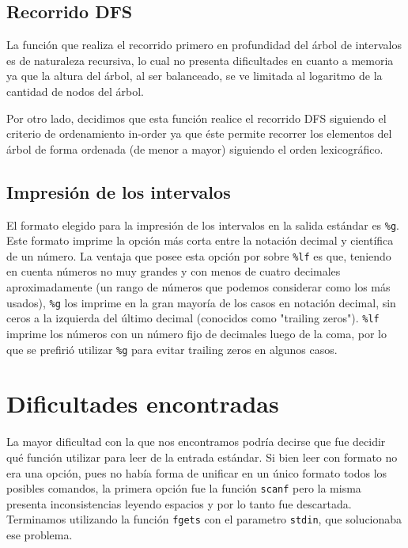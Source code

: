 \documentclass[11pt]{article}
\begin{document}
 \subsection{Recorrido DFS}
 
 La función que realiza el recorrido primero en profundidad del árbol de intervalos es de naturaleza recursiva, lo cual no presenta dificultades en cuanto a memoria ya que la altura del árbol, al ser balanceado, se ve limitada al logaritmo de la cantidad de nodos del árbol. \par

 Por otro lado, decidimos que esta función realice el recorrido DFS siguiendo el criterio de ordenamiento in-order ya que éste permite recorrer los elementos del árbol de forma ordenada (de menor a mayor) siguiendo el orden lexicográfico.\par
 
 \subsection{Impresión de los intervalos}
 
 El formato elegido para la impresión de los intervalos en la salida estándar es \verb|%g|. Este formato imprime la opción más corta entre la notación decimal y científica de un número.  La ventaja que posee esta opción por sobre \verb|%lf| es que, teniendo en cuenta números no muy grandes y con menos de cuatro decimales aproximadamente (un rango de números que podemos considerar como los más usados), \verb|%g| los imprime en la gran mayoría de los casos en notación decimal, sin ceros a la izquierda del último decimal (conocidos como "trailing zeros"). \verb|%lf| imprime los números con un número fijo de decimales luego de la coma, por lo que se prefirió utilizar \verb|%g| para evitar trailing zeros en algunos casos.
 
 \section{Dificultades encontradas}
 
 La mayor dificultad con la que nos encontramos podría decirse que fue decidir qué función utilizar para leer de la entrada estándar. Si bien leer con formato no era una opción, pues no había forma de unificar en un único formato todos los posibles comandos, la primera opción fue la función \verb|scanf| pero la misma presenta inconsistencias leyendo espacios y por lo tanto fue descartada. Terminamos utilizando la función \verb|fgets| con el parametro \verb|stdin|, que solucionaba ese problema. \par
\end{document}
